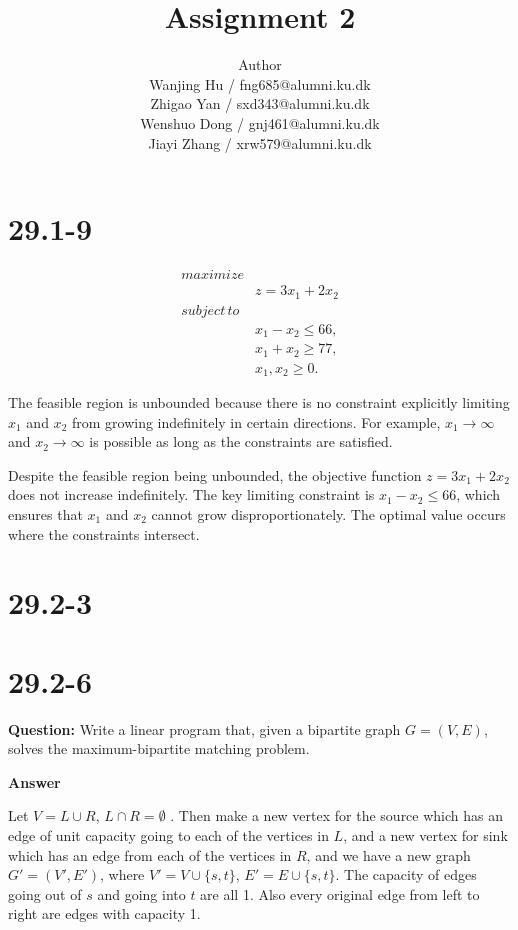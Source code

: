 \documentclass[12pt]{article}
\title{Assignment 2}
\author{Author \\
  Wanjing Hu / fng685@alumni.ku.dk  \\
  Zhigao Yan / sxd343@alumni.ku.dk  \\
  Wenshuo Dong / gnj461@alumni.ku.dk  \\
  Jiayi Zhang / xrw579@alumni.ku.dk \\
}
\begin{document}
\maketitle

\section{29.1-9}
\[
\begin{aligned}
maximize& \\
& z = 3x_1 + 2x_2 \\
subject \, to&  \\
& x_1 - x_2 \leq 66, \\ 
& x_1 + x_2 \geq 77,\\
& x_1, x_2 \geq 0.
\end{aligned}
\]

The feasible region is unbounded because there is no constraint explicitly limiting \(x_1\) and \(x_2\) from growing indefinitely in certain directions.
For example, \(x_1 \to \infty\) and \(x_2 \to \infty\) is possible as long as the constraints are satisfied.

Despite the feasible region being unbounded, the objective function \(z = 3x_1 + 2x_2\) does not increase indefinitely. The key limiting constraint is \(x_1 - x_2 \leq 66\), which ensures that \(x_1\) and \(x_2\) cannot grow disproportionately. The optimal value occurs where the constraints intersect.
\section{29.2-3}

\section{29.2-6}
\textbf{Question:}
Write a linear program that, given a bipartite graph $G = (V,E)$, solves the maximum-bipartite matching problem.

\textbf{Answer}

Let $V = L \cup R$, $L \cap R = \emptyset$ . Then make a new vertex for the source which has an edge of unit capacity going to each of the vertices in $L$, and a new vertex for sink which has an edge from each of the vertices in $R$, and we have a new graph $G'=(V',E')$, where $V' = V \cup \{s,t\}$, $E' = E \cup \{s, t\}$. The capacity of edges going out of $s$ and going into $t$ are all 1. Also every original edge from left to right are edges with capacity 1.
\end{document}
